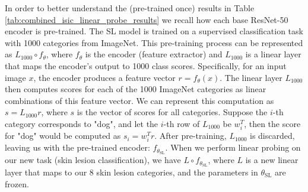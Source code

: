 \documentclass[a4paper,fleqn]{cas-dc}
\begin{document}

In order to better understand the (pre-trained once) results in Table \ref{tab:combined_isic_linear_probe_results}  we recall how each base  ResNet-50 encoder is pre-trained. The SL model is trained on a supervised classification task with 1000 categories from ImageNet. This pre-training process can be represented as $L_{1000} \circ f_\theta$, where $f_\theta$ is the encoder (feature extractor) and $L_{1000}$ is a linear layer that maps the encoder's output to 1000 class scores. Specifically, for an input image $x$, the encoder produces a feature vector $r = f_\theta(x)$. The linear layer $L_{1000}$ then computes scores for each of the 1000 ImageNet categories as linear combinations of this feature vector. We can represent this computation as $s = L_{1000}r$, where $s$ is the vector of scores for all categories. Suppose the $i$-th category corresponds to "dog", and let the $i$-th row of $L_{1000}$ be $w_i^T$, then the score for "dog" would be computed as $s_i = w_i^T r$. After pre-training, $L_{1000}$ is discarded, leaving us with the pre-trained encoder: $f_{\theta_{\scriptscriptstyle\text{SL}}}$. When we perform linear probing on our new task (skin lesion classification), we have $L \circ f_{\theta_{\scriptscriptstyle\text{SL}}}$, where $L$ is a new linear layer that maps to our 8 skin lesion categories, and the parameters in $\theta_{\scriptscriptstyle\text{SL}}$ are frozen. 
\end{document}
